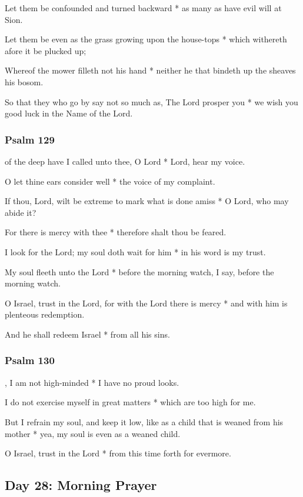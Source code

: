 Let them be confounded and turned backward * as many as have evil will at Sion.

Let them be even as the grass growing upon the house-tops * which withereth afore it be plucked up;

Whereof the mower filleth not his hand * neither he that bindeth up the sheaves his bosom.

So that they who go by say not so much as, The Lord prosper you * we wish you good luck in the Name of the Lord.

\subsubsection{Psalm 129}


 of the deep have I called unto thee, O Lord * Lord, hear my voice.

O let thine ears consider well * the voice of my complaint.

If thou, Lord, wilt be extreme to mark what is done amiss * O Lord, who may abide it?

For there is mercy with thee * therefore shalt thou be feared.

I look for the Lord; my soul doth wait for him * in his word is my trust.

My soul fleeth unto the Lord * before the morning watch, I say, before the morning watch.

O Israel, trust in the Lord, for with the Lord there is mercy * and with him is plenteous redemption.

And he shall redeem Israel * from all his sins.

\subsubsection{Psalm 130}


, I am not high-minded * I have no proud looks.

I do not exercise myself in great matters * which are too high for me.

But I refrain my soul, and keep it low, like as a child that is weaned from his mother * yea, my soul is even as a weaned child.

O Israel, trust in the Lord * from this time forth for evermore.

\subsection{Day 28: Morning Prayer}

